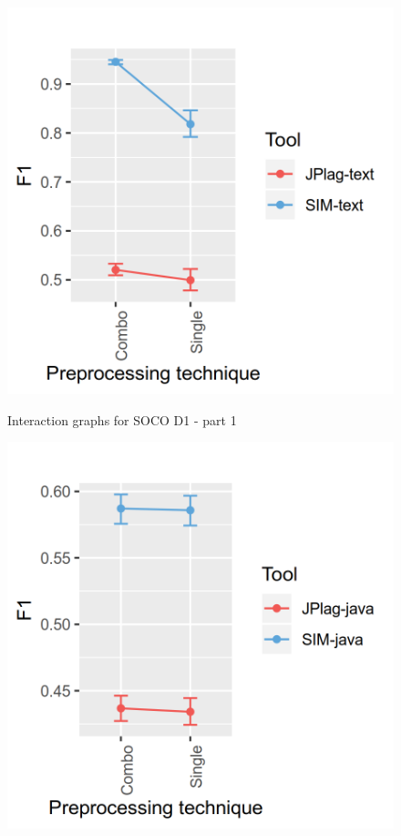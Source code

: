 \documentclass[a4paper, 12pt, oneside, openany, final, pdftex]{book}\usepackage[]{graphicx}\usepackage[]{color}
\makeatletter
\def\maxwidth{ %
  \ifdim\Gin@nat@width>\linewidth
    \linewidth
  \else
    \Gin@nat@width
  \fi
}
\makeatother
\begin{document}
\begin{appendices}
\begin{figure}[ht]
\label{fig:interaction- 8 for SOCO D1 }\endminipage\hfill {} 
\includegraphics[width=\maxwidth]{figure/Figure-SOCO-INTERACTION-9} 
\label{fig:interaction- 9 for SOCO D1 }\endminipage\hfill \caption{Interaction graphs for  SOCO D1  - part 1}\label{fig:interaction SOCO D1 -part1}\end{figure}\begin{figure}[ht]\centering{} 
\includegraphics[width=\maxwidth]{figure/Figure-SOCO-INTERACTION-10} 

\end{figure}
\end{appendices}
\end{document}

